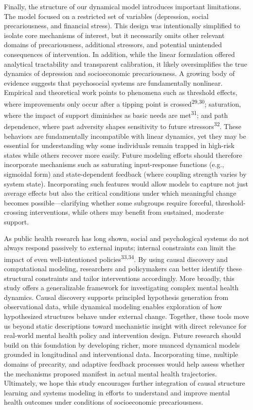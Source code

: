 \documentclass[
]{article}
\begin{document}
Finally, the structure of our dynamical model introduces important
limitations. The model focused on a restricted set of variables
(depression, social precariousness, and financial stress). This design
was intentionally simplified to isolate core mechanisms of interest, but
it necessarily omits other relevant domains of precariousness,
additional stressors, and potential unintended consequences of
intervention. In addition, while the linear formulation offered
analytical tractability and transparent calibration, it likely
oversimplifies the true dynamics of depression and socioeconomic
precariousness. A growing body of evidence suggests that psychosocial
systems are fundamentally nonlinear. Empirical and theoretical work
points to phenomena such as threshold effects, where improvements only
occur after a tipping point is crossed\textsuperscript{29,30};
saturation, where the impact of support diminishes as basic needs are
met\textsuperscript{31}; and path dependence, where past adversity
shapes sensitivity to future stressors\textsuperscript{32}. These
behaviors are fundamentally incompatible with linear dynamics, yet they
may be essential for understanding why some individuals remain trapped
in high-risk states while others recover more easily. Future modeling
efforts should therefore incorporate mechanisms such as saturating
input-response functions (e.g., sigmoidal form) and state-dependent
feedback (where coupling strength varies by system state). Incorporating
such features would allow models to capture not just average effects but
also the critical conditions under which meaningful change becomes
possible---clarifying whether some subgroups require forceful,
threshold-crossing interventions, while others may benefit from
sustained, moderate support.

As public health research has long shown, social and psychological
systems do not always respond passively to external inputs; internal
constraints can limit the impact of even well-intentioned
policies\textsuperscript{33,34}. By using causal discovery and
computational modeling, researchers and policymakers can better identify
these structural constraints and tailor interventions accordingly. More
broadly, this study offers a generalizable framework for investigating
complex mental health dynamics. Causal discovery supports principled
hypothesis generation from observational data, while dynamical modeling
enables exploration of how hypothesized structures behave under external
change. Together, these tools move us beyond static descriptions toward
mechanistic insight with direct relevance for real-world mental health
policy and intervention design. Future research should build on this
foundation by developing richer, more nuanced dynamical models grounded
in longitudinal and interventional data. Incorporating time, multiple
domains of precarity, and adaptive feedback processes would help assess
whether the mechanisms proposed manifest in actual mental health
trajectories. Ultimately, we hope this study encourages further
integration of causal structure learning and systems modeling in efforts
to understand and improve mental health outcomes under conditions of
socioeconomic precariousness.
\end{document}
